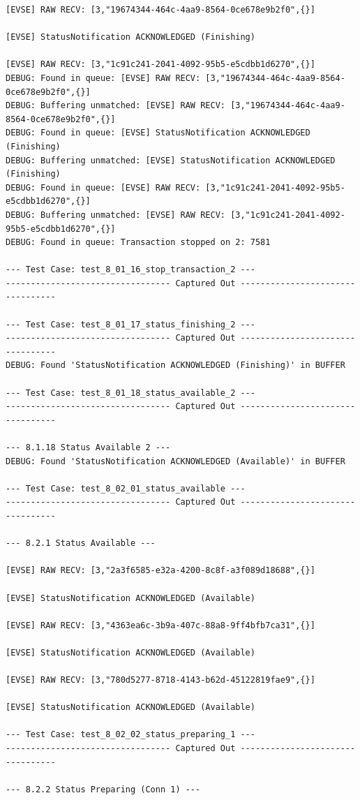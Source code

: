\documentclass{article}
\begin{document}
\begin{lstlisting}
[EVSE] RAW RECV: [3,"19674344-464c-4aa9-8564-0ce678e9b2f0",{}]

[EVSE] StatusNotification ACKNOWLEDGED (Finishing)

[EVSE] RAW RECV: [3,"1c91c241-2041-4092-95b5-e5cdbb1d6270",{}]
DEBUG: Found in queue: [EVSE] RAW RECV: [3,"19674344-464c-4aa9-8564-0ce678e9b2f0",{}]
DEBUG: Buffering unmatched: [EVSE] RAW RECV: [3,"19674344-464c-4aa9-8564-0ce678e9b2f0",{}]
DEBUG: Found in queue: [EVSE] StatusNotification ACKNOWLEDGED (Finishing)
DEBUG: Buffering unmatched: [EVSE] StatusNotification ACKNOWLEDGED (Finishing)
DEBUG: Found in queue: [EVSE] RAW RECV: [3,"1c91c241-2041-4092-95b5-e5cdbb1d6270",{}]
DEBUG: Buffering unmatched: [EVSE] RAW RECV: [3,"1c91c241-2041-4092-95b5-e5cdbb1d6270",{}]
DEBUG: Found in queue: Transaction stopped on 2: 7581

--- Test Case: test_8_01_16_stop_transaction_2 ---
--------------------------------- Captured Out ---------------------------------

--- Test Case: test_8_01_17_status_finishing_2 ---
--------------------------------- Captured Out ---------------------------------
DEBUG: Found 'StatusNotification ACKNOWLEDGED (Finishing)' in BUFFER

--- Test Case: test_8_01_18_status_available_2 ---
--------------------------------- Captured Out ---------------------------------

--- 8.1.18 Status Available 2 ---
DEBUG: Found 'StatusNotification ACKNOWLEDGED (Available)' in BUFFER

--- Test Case: test_8_02_01_status_available ---
--------------------------------- Captured Out ---------------------------------

--- 8.2.1 Status Available ---

[EVSE] RAW RECV: [3,"2a3f6585-e32a-4200-8c8f-a3f089d18688",{}]

[EVSE] StatusNotification ACKNOWLEDGED (Available)

[EVSE] RAW RECV: [3,"4363ea6c-3b9a-407c-88a8-9ff4bfb7ca31",{}]

[EVSE] StatusNotification ACKNOWLEDGED (Available)

[EVSE] RAW RECV: [3,"780d5277-8718-4143-b62d-45122819fae9",{}]

[EVSE] StatusNotification ACKNOWLEDGED (Available)

--- Test Case: test_8_02_02_status_preparing_1 ---
--------------------------------- Captured Out ---------------------------------

--- 8.2.2 Status Preparing (Conn 1) ---


\end{lstlisting}
\end{document}
